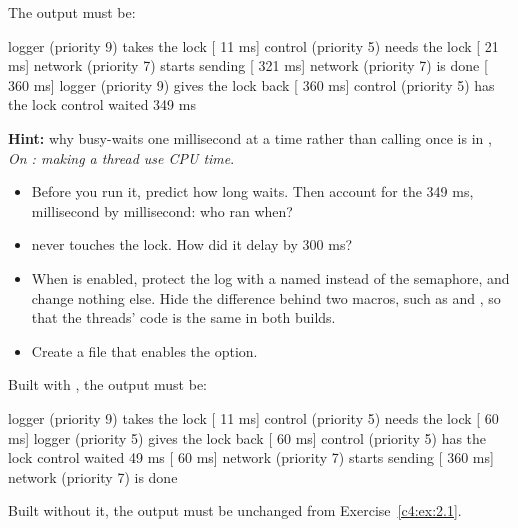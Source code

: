 The output must be:

\begin{console}
[   0 ms] logger  (priority 9) takes the lock
[  11 ms] control (priority 5) needs the lock
[  21 ms] network (priority 7) starts sending
[ 321 ms] network (priority 7) is done
[ 360 ms] logger  (priority 9) gives the lock back
[ 360 ms] control (priority 5) has the lock
control waited 349 ms
\end{console}

\noindent \textbf{Hint:} why  busy-waits one millisecond at a time rather than
calling  once is in , \emph{On : making a
thread use CPU time}.

\begin{itemize}
  \item Before you run it, predict how long  waits. Then account for the 349 ms, millisecond
    by millisecond: who ran when?
  \item {} never touches the lock. How did it delay  by 300 ms?
\end{itemize}

\label{c4:ex:2.2}

\begin{itemize}
  \item When  is enabled, protect the log with a  named
     instead of the semaphore, and change nothing else. Hide the difference behind two
    macros, such as  and , so that the threads’ code is the same in both
    builds.
  \item Create a file  that enables the option.
\end{itemize}

Built with , the output must be:

\begin{console}
[   0 ms] logger  (priority 9) takes the lock
[  11 ms] control (priority 5) needs the lock
[  60 ms] logger  (priority 5) gives the lock back
[  60 ms] control (priority 5) has the lock
control waited 49 ms
[  60 ms] network (priority 7) starts sending
[ 360 ms] network (priority 7) is done
\end{console}

\noindent Built without it, the output must be unchanged from Exercise~\ref{c4:ex:2.1}.

